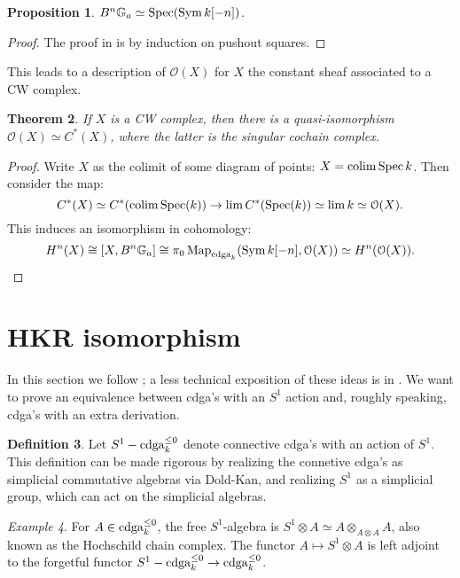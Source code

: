 \documentclass[10pt,a4paper,reqno,oneside]{book} %
\theoremstyle{plain}
\newtheorem{thm}{Theorem}[section]
\newtheorem{prop}[thm]{Proposition}
\theoremstyle{definition}
\newtheorem{defin}[thm]{Definition}
\theoremstyle{remark}
\newtheorem{eg}[thm]{Example}
\numberwithin{equation}{section}
\begin{document}
\begin{prop}
$B^n\mathbb G_a \simeq \operatorname{Spec}(\operatorname{Sym} k[-n])$.
\end{prop}
\begin{proof}
The proof in \cite{vezzosi2013autour} is by induction on pushout squares.
\end{proof}

This leads to a description of $\mathcal{O}(X)$ for $X$ the constant sheaf associated to a CW complex.

\begin{thm}
\label{thm:global_cochain}
If $X$ is a CW complex, then there is a quasi-isomorphism $\mathcal{O}(X) \simeq C^*(X)$, where the latter is the singular
cochain complex.
\end{thm}
\begin{proof}
Write $X$ as the colimit of some diagram of points: $X = \operatorname*{colim} \operatorname{Spec} k$. Then consider the map:
\[	C^*(X) \simeq C^*(\operatorname*{colim} \operatorname{Spec}(k)) \to \lim C^*(\operatorname{Spec}(k)) \simeq \lim k \simeq \mathcal{O}(X) .	\]
This induces an isomorphism in cohomology:
\[	H^n(X) \cong [X,B^n\mathbb G_a] \cong \pi_0 \operatorname{Map}_{\operatorname{cdga}_k}(\operatorname{Sym} k[-n], \mathcal{O}(X) ) \simeq H^n(\mathcal{O}(X)).	\]
\end{proof}



\section{HKR isomorphism}
In this section we follow \cite{TV_HKR}; a less technical exposition of these ideas is in \cite{BZN_loop}. We want
to prove an equivalence between cdga's with an $S^1$ action and, roughly speaking, cdga's with an extra derivation.

\begin{defin}
Let $S^1-\operatorname{cdga}_k^{\leq 0}$ denote connective cdga's with an action of $S^1$. This definition can be made rigorous by realizing
the connetive cdga's as simplicial commutative algebras via Dold-Kan, and realizing $S^1$ as a simplicial group, which can
act on the simplicial algebras.
\end{defin}

\begin{eg}
For $A \in \operatorname{cdga}_k^{\leq 0}$, the free $S^1$-algebra is $S^1 \otimes A \simeq A \otimes_{A\otimes A} A$, also known as the
Hochschild chain complex. The functor $A \mapsto S^1 \otimes A$ is left adjoint to the forgetful functor $S^1-\operatorname{cdga}_k^{\leq 0}
\to \operatorname{cdga}_k^{\leq 0}$.
\end{eg}
\end{document}

